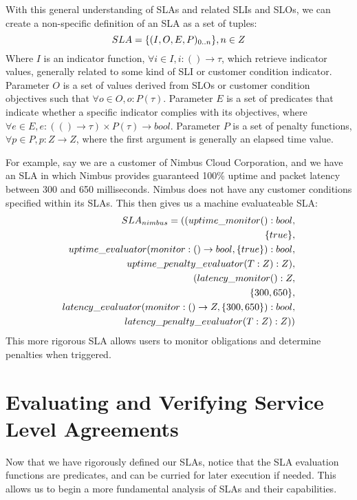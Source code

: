 With this general understanding of SLAs and related SLIs and SLOs, we can create a non-specific definition of an SLA as a set of tuples:
\begin{equation}
SLA = \lbrace (I,O,E,P)_{0..n} \rbrace, n \in Z \\
\end{equation}
Where $ I $ is an indicator function, $ \forall i \in I, i : () \rightarrow \tau $, which retrieve indicator values, generally related to some kind of SLI or customer condition indicator.  Parameter $ O $ is a set of values derived from SLOs or customer condition objectives such that $ \forall o \in O, o : P(\tau) $.  Parameter $ E $ is a set of predicates that indicate whether a specific indicator complies with its objectives, where $ \forall e \in E, e : ( () \rightarrow \tau ) \times P(\tau) \rightarrow bool $.  Parameter $ P $ is a set of penalty functions, $ \forall p \in P, p : Z \rightarrow Z $, where the first argument is generally an elapsed time value.

For example, say we are a customer of Nimbus Cloud Corporation, and we have an SLA in which Nimbus provides guaranteed 100\% uptime and packet latency between 300 and 650 milliseconds.  Nimbus does not have any customer conditions specified within its SLAs.  This then gives us a machine evaluateable SLA:
\begin{align}
SLA_{nimbus} = ( ( uptime\_monitor() : bool, \notag\\
\lbrace true \rbrace, \notag \\
uptime\_evaluator( monitor : () \rightarrow bool, \lbrace true \rbrace) : bool, \notag \\
uptime\_penalty\_evaluator( T : Z ) : Z ), \notag \\
( latency\_monitor() : Z, \notag \\
\lbrace 300, 650 \rbrace, \notag \\
latency\_evaluator( monitor : () \rightarrow Z, \lbrace 300, 650 \rbrace) : bool, \notag \\
latency\_penalty\_evaluator( T : Z ) : Z) ) \notag
\end{align}
This more rigorous SLA allows users to monitor obligations and determine penalties when triggered.

\section{Evaluating and Verifying Service Level Agreements}\label{sec:SLA-analysis}
Now that we have rigorously defined our SLAs, notice that the SLA evaluation functions are predicates, and can be curried for later execution if needed.  This allows us to begin a more fundamental analysis of SLAs and their capabilities.

